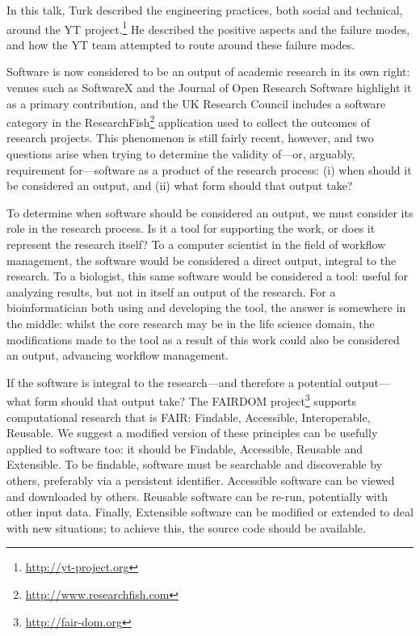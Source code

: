 \documentclass[a4paper,UKenglish]{dagrep}
\begin{document}

In this talk, Turk described the engineering practices, both social and
technical, around the YT project.\footnote{\url{http://yt-project.org}}
He described the positive aspects and the failure modes, and how the YT team attempted to
route around these failure modes.


Software is now considered to be an output of academic research in its own right: venues such as SoftwareX and the Journal of Open Research Software highlight it as a primary contribution, and the UK Research Council includes a software category in the ResearchFish\footnote{\url{http://www.researchfish.com}} application used to collect the outcomes of research projects. This phenomenon is still fairly recent, however, and two questions arise when trying to determine the validity of---or, arguably, requirement for---software as a product of the research process: (i) when should it be considered an output, and (ii) what form should that output take?

To determine when software should be considered an output, we must consider its role in the research process. Is it a tool for supporting the work, or does it represent the research itself? To a computer scientist in the field of workflow management, the software would be considered a direct output, integral to the research. To a biologist, this same software would be considered a tool: useful for analyzing results, but not in itself an output of the research. For a bioinformatician both using and developing the tool, the answer is somewhere in the middle: whilst the core research may be in the life science domain, the modifications made to the tool as a result of this work could also be considered an output, advancing workflow management.

If the software is integral to the research---and therefore a potential output---what form should that output take? The FAIRDOM project\footnote{\url{http://fair-dom.org}} supports computational research that is FAIR: Findable, Accessible, Interoperable, Reusable. We suggest a modified version of these principles can be usefully applied to software too: it should be Findable, Accessible, Reusable and Extensible. To be findable, software must be searchable and discoverable by others, preferably via a persistent identifier. Accessible software can be viewed and downloaded by others. Reusable software can be re-run, potentially with other input data. Finally, Extensible software can be modified or extended to deal with new situations; to achieve this, the source code should be available.
\end{document}
